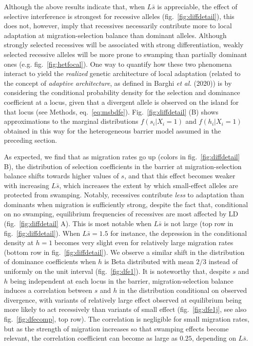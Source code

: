 \documentclass[
  11pt,
]{article}
\begin{document}
Although the above results indicate that, when \(L\bar{s}\) is
appreciable, the effect of selective interference is strongest for
recessive alleles (fig.~\ref{fig:diffdetail}), this does not, however,
imply that recessives necessarily contribute more to local adaptation at
migration-selection balance than dominant alleles. Although strongly
selected recessives will be associated with strong differentiation,
weakly selected recessive alleles will be more prone to swamping than
partially dominant ones (e.g. fig.~\ref{fig:hetfocal}). One way to
quantify how these two phenomena interact to yield the \emph{realized}
genetic architecture of local adaptation (related to the concept of
\emph{adaptive architecture}, as defined in Barghi \emph{et al.} (2020))
is by considering the conditional probability density for the selection
and dominance coefficient at a locus, given that a divergent allele is
observed on the island for that locus (see Methods,
eq.~\ref{eq:msbdfe}). Fig.~\ref{fig:diffdetail} (B) shows approximations
to the marginal distributions \(f(s_i|X_i=1)\) and \(f(h_i|X_i=1)\)
obtained in this way for the heterogeneous barrier model assumed in the
preceding section.

As expected, we find that as migration rates go up (colors in
fig.~\ref{fig:diffdetail} B), the distribution of selection coefficients
in the barrier at migration-selection balance shifts towards higher
values of \(s\), and that this effect becomes weaker with increasing
\(L\bar{s}\), which increases the extent by which small-effect alleles
are protected from swamping. Notably, recessives contribute \emph{less}
to adaptation than dominants when migration is sufficiently strong,
despite the fact that, conditional on no swamping, equilibrium
frequencies of recessives are most affected by LD
(fig.~\ref{fig:diffdetail} A). This is most notable when \(L\bar{s}\) is
not large (top row in fig.~\ref{fig:diffdetail}). When
\(L\bar{s} = 1.5\) for instance, the depression in the conditional
density at \(h=1\) becomes very slight even for relatively large
migration rates (bottom row in fig.~\ref{fig:diffdetail}). We observe a
similar shift in the distribution of dominance coefficients when \(h\)
is Beta distributed with mean \(2/3\) instead of uniformly on the unit
interval (fig.~\ref{fig:dfe1}). It is noteworthy that, despite \(s\) and
\(h\) being independent at each locus in the barrier,
migration-selection balance induces a correlation between \(s\) and
\(h\) in the distribution conditional on observed divergence, with
variants of relatively large effect observed at equilibrium being more
likely to act recessively than variants of small effect
(fig.~\ref{fig:dfe1j}, see also fig.~\ref{fig:dfecomp}, top row). The
correlation is negligible for small migration rates, but as the strength
of migration increases so that swamping effects become relevant, the
correlation coefficient can become as large as \(0.25\), depending on
\(L\bar{s}\).
\end{document}
